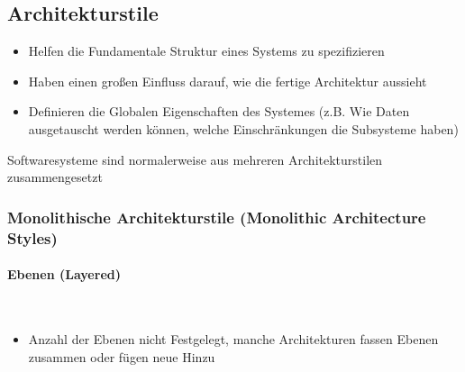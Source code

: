 \documentclass[
    ngerman,
    color=3b,
    summary,
    boxarc,
    main,
]{rubos-tuda-template}
\begin{document}
\subsection{Architekturstile}
\begin{itemize}
    \item Helfen die Fundamentale Struktur eines Systems zu spezifizieren
    \item Haben einen großen Einfluss darauf, wie die fertige Architektur aussieht
    \item Definieren die Globalen Eigenschaften des Systemes (z.B. Wie Daten ausgetauscht werden können, welche Einschränkungen die Subsysteme haben)
\end{itemize}
Softwaresysteme sind normalerweise aus mehreren Architekturstilen zusammengesetzt
\clearpage
\subsubsection{Monolithische Architekturstile (Monolithic Architecture Styles)}
\paragraph{Ebenen (Layered)}\mbox{}\\
\begin{figure}[h]
    \centering
\end{figure}
\FloatBarrier
\begin{itemize}
    \item Anzahl der Ebenen nicht Festgelegt, manche Architekturen fassen Ebenen zusammen oder fügen neue Hinzu
\end{itemize}
\end{document}
